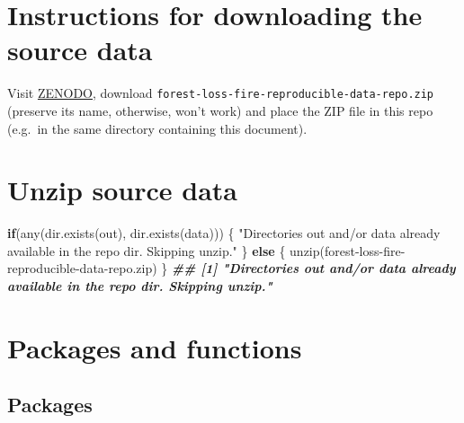 \documentclass[10pt,landscape,a3paper]{article}
\newenvironment{Shaded}{\begin{snugshade}}{\end{snugshade}}
\newcommand{\ControlFlowTok}[1]{\textcolor[rgb]{0.13,0.29,0.53}{\textbf{#1}}}
\newcommand{\DocumentationTok}[1]{\textcolor[rgb]{0.56,0.35,0.01}{\textbf{\textit{#1}}}}
\newcommand{\FunctionTok}[1]{\textcolor[rgb]{0.00,0.00,0.00}{#1}}
\newcommand{\NormalTok}[1]{#1}
\newcommand{\StringTok}[1]{\textcolor[rgb]{0.31,0.60,0.02}{#1}}
\begin{document}
\hypertarget{instructions-for-downloading-the-source-data}{%
\section{Instructions for downloading the source
data}\label{instructions-for-downloading-the-source-data}}

Visit \href{https://zenodo.org/record/5681481}{ZENODO}, download
\texttt{forest-loss-fire-reproducible-data-repo.zip} (preserve its name,
otherwise, won't work) and place the ZIP file in this repo (e.g.~in the
same directory containing this document).

\hypertarget{unzip-source-data}{%
\section{Unzip source data}\label{unzip-source-data}}

\begin{Shaded}
\begin{Highlighting}[]
\ControlFlowTok{if}\NormalTok{(}\FunctionTok{any}\NormalTok{(}\FunctionTok{dir.exists}\NormalTok{(}\StringTok{\textquotesingle{}out\textquotesingle{}}\NormalTok{), }\FunctionTok{dir.exists}\NormalTok{(}\StringTok{\textquotesingle{}data\textquotesingle{}}\NormalTok{))) \{}
  \StringTok{"Directories \textquotesingle{}out\textquotesingle{} and/or \textquotesingle{}data\textquotesingle{} already available in the repo dir. Skipping unzip."}
\NormalTok{\} }\ControlFlowTok{else}\NormalTok{ \{}
  \FunctionTok{unzip}\NormalTok{(}\StringTok{\textquotesingle{}forest{-}loss{-}fire{-}reproducible{-}data{-}repo.zip\textquotesingle{}}\NormalTok{) }
\NormalTok{\}}
\DocumentationTok{\#\# [1] "Directories \textquotesingle{}out\textquotesingle{} and/or \textquotesingle{}data\textquotesingle{} already available in the repo dir. Skipping unzip."}
\end{Highlighting}
\end{Shaded}

\hypertarget{packages-and-functions}{%
\section{Packages and functions}\label{packages-and-functions}}

\hypertarget{packages}{%
\subsection{Packages}\label{packages}}
\end{document}
